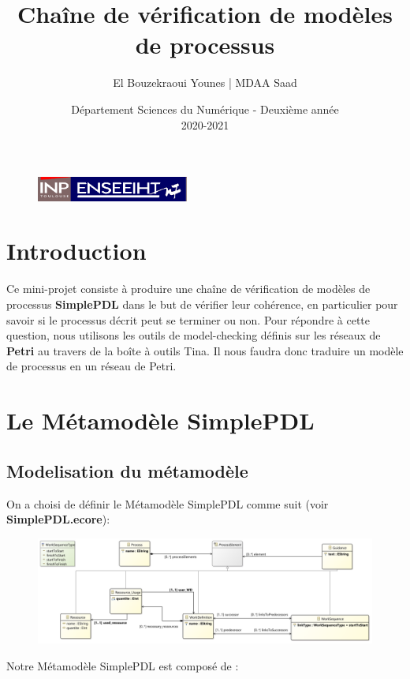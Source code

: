 \documentclass{article}
\begin{document}
\begin{figure}[t]
\centering
\includegraphics[width=5cm]{inp_n7.png}
\end{figure}

\title{\vspace{4cm} \textbf{Chaîne de vérification de modèles de processus}}
\author{El Bouzekraoui Younes | MDAA Saad}
\date{\vspace{7cm} Département Sciences du Numérique - Deuxième année \\
2020-2021 }

\maketitle

\newpage
\tableofcontents

\newpage
\section{Introduction}
Ce mini-projet consiste à produire une chaîne de vérification de modèles de processus \textbf{SimplePDL} dans le but de vérifier leur cohérence,
en particulier pour savoir si le processus décrit peut se terminer ou non. Pour répondre à cette question, nous utilisons les outils de model-checking
définis sur les réseaux de \textbf{Petri} au travers de la boîte à outils Tina. Il nous faudra donc traduire un modèle de processus en un réseau de Petri.

\section{Le Métamodèle \textbf{SimplePDL}}
\subsection{Modelisation du métamodèle}
On a choisi de définir le Métamodèle SimplePDL comme suit (voir \textbf{SimplePDL.ecore}):
\begin{figure}[H]
    \centering
    \includegraphics[width = 18cm]{SimplePDL.png}
\end{figure}
Notre Métamodèle SimplePDL est composé de : 
\end{document}

